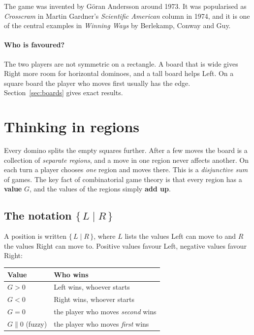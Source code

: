 \documentclass[11pt,a4paper]{article}
\newcommand{\dm}{\mathbin{\vert}}  %
\newcommand{\game}[2]{\{\,#1 \dm #2\,\}}
\begin{document}
The game was invented by Göran Andersson around 1973.  It was popularised as
\emph{Crosscram} in Martin Gardner's \emph{Scientific American} column in 1974, and it is
one of the central examples in \emph{Winning Ways} by Berlekamp, Conway and Guy.

\paragraph{Who is favoured?}  The two players are not symmetric on a rectangle.  A board that is
wide gives Right more room for horizontal dominoes, and a tall board helps Left.  On a square
board the player who moves first usually has the edge.  Section~\ref{sec:boards} gives exact
results.

\section{Thinking in regions}

Every domino splits the empty squares further.  After a few moves the board is a collection of
\emph{separate regions}, and a move in one region never affects another.  On each turn a player
chooses \emph{one} region and moves there.  This is a \emph{disjunctive sum} of games.  The key
fact of combinatorial game theory is that every region has a \textbf{value} $G$, and the values
of the regions simply \textbf{add up}.

\subsection{\texorpdfstring{The notation $\{\,L \mid R\,\}$}{The notation {L | R}}}

A position is written $\game{L}{R}$, where $L$ lists the values Left can move to and $R$ the
values Right can move to.  Positive values favour Left, negative values favour Right:

\begin{center}
\begin{tabular}{@{}l>{\raggedright\arraybackslash}p{}@{}}
\toprule
Value & Who wins \\
\midrule
$G>0$ & Left wins, whoever starts \\
$G<0$ & Right wins, whoever starts \\
$G=0$ & the player who moves \emph{second} wins \\
$G \parallel 0$ (fuzzy) & the player who moves \emph{first} wins \\
\bottomrule
\end{tabular}
\end{center}
\end{document}
